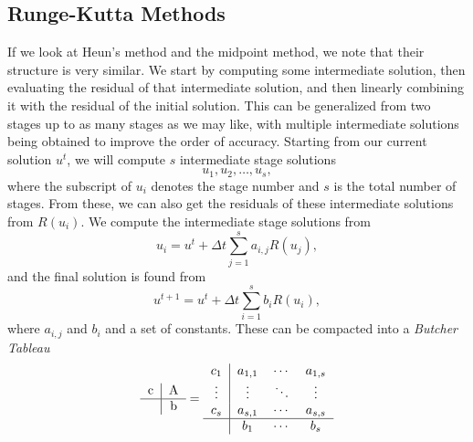 \subsection{Runge-Kutta Methods}
If we look at Heun's method and the midpoint method, we note that their structure is very similar. We start by computing some intermediate solution, then evaluating the residual of that intermediate solution, and then linearly combining it with the residual of the initial solution. This can be generalized from two stages up to as many stages as we may like, with multiple intermediate solutions being obtained to improve the order of accuracy. Starting from our current solution $u^t$, we will compute $s$ intermediate stage solutions
\begin{equation}
	u_1, u_2, \hdots, u_s,
\end{equation}
where the subscript of $u_i$ denotes the stage number and $s$ is the total number of stages. From these, we can also get the residuals of these intermediate solutions from $R(u_i)$. We compute the intermediate stage solutions from
\begin{equation}
	u_i = u^t + \Delta t \sum_{j=1}^s a_{i,j} R(u_j),
\end{equation}
and the final solution is found from
\begin{equation}
	u^{t+1} = u^t + \Delta t \sum_{i=1}^s b_i R(u_i),
\end{equation}
where $a_{i,j}$ and $b_i$ and a set of constants. These can be compacted into a {\it Butcher Tableau}
\begin{equation}
	\begin{tabular}{c|ccccc}
 
	c   & A \\
 
	\hline
 
	         & b\\
 
	\end{tabular}
    = 	
	\begin{tabular}{c|ccccc}
 
	$c_1$    & $a_{1,1}$ & $\cdots$ & $a_{1,s}$ \\
 
	$\vdots$ & $\vdots$ &  $\ddots$ & $\vdots$\\
 
	$c_s$    & $a_{s,1}$  & $\cdots$ & $a_{s,s}$\\
 
	\hline
 
	         & $b_1$  & $\cdots$ & $b_s$\\
 
	\end{tabular}
\end{equation}

